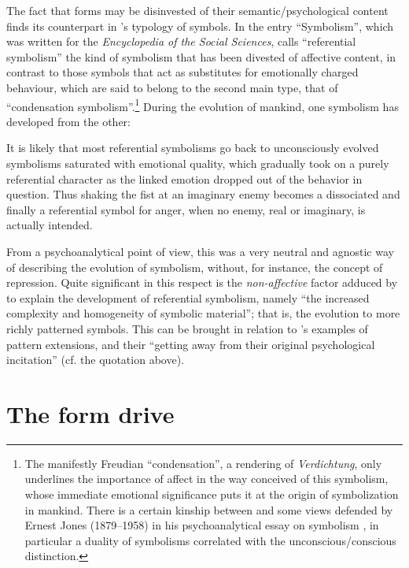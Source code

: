 \documentclass[output=paper]{langscibook}
\begin{document}
The fact that forms may be disinvested of their semantic/psychological content finds its counterpart in {\Sapir}'s typology of symbols. In the entry ``Symbolism'', which was written for the \emph{Encyclopedia of the Social Sciences}, \citet{Sapir1934} calls ``referential symbolism'' the kind of symbolism that has been divested of affective content, in contrast to those symbols that act as substitutes for emotionally charged behaviour, which are said to belong to the second main type, that of ``condensation symbolism''.\footnote{The manifestly Freudian ``condensation'', a rendering of \emph{Verdichtung}, only underlines the importance of affect in the way {\Sapir} conceived of this symbolism, whose immediate emotional significance puts it at the origin of symbolization in mankind. There is a certain kinship between {\Sapir} and some views defended by Ernest Jones (1879--1958) in his psychoanalytical essay on symbolism \citep{Jones1916}, in particular a duality of symbolisms correlated with the unconscious/conscious distinction.} During the evolution of mankind, one symbolism has developed from the other: 

\begin{modquote}
It is likely that most referential symbolisms go back to unconsciously evolved symbolisms saturated with emotional quality, which gradually took on a purely referential character as the linked emotion dropped out of the behavior in question. Thus shaking the fist at an imaginary enemy becomes a dissociated and finally a referential symbol for anger, when no enemy, real or imaginary, is actually intended. \citep[565]{Sapir1934}
\end{modquote}

From a psychoanalytical point of view, this was a very neutral and agnostic way of describing the evolution of symbolism, without, for instance, the concept of repression. Quite significant in this respect is the \emph{non-affective} factor adduced by {\Sapir} to explain the development of referential symbolism, namely ``the increased complexity and homogeneity of symbolic material''; that is, the evolution to more richly patterned symbols. This can be brought in relation to {\Sapir}'s examples of pattern extensions, and their ``getting away from their original psychological incitation'' (cf. the quotation above). 

\section{The form drive}
\label{sec:fortis:formdrive}
\end{document}
